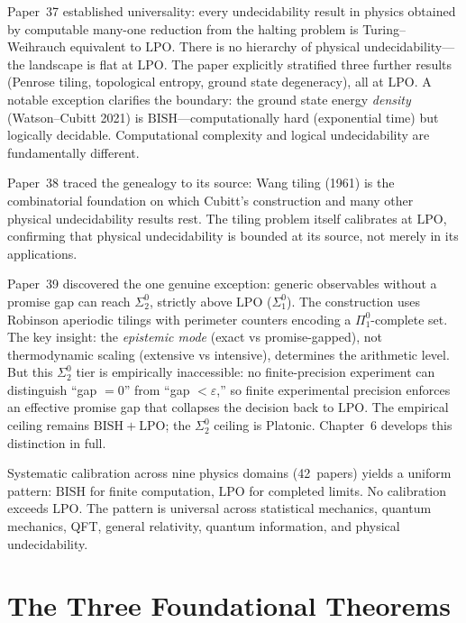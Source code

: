 \documentclass[11pt,a4paper]{report}
\theoremstyle{plain}
\theoremstyle{definition}
\theoremstyle{remark}
\newcommand{\BISH}{\mathrm{BISH}}
\newcommand{\LPO}{\mathrm{LPO}}
\begin{document}
Paper~37 established universality: every undecidability result in physics obtained by computable many-one reduction from the halting problem is Turing--Weihrauch equivalent to $\LPO$.  There is no hierarchy of physical undecidability---the landscape is flat at $\LPO$.  The paper explicitly stratified three further results (Penrose tiling, topological entropy, ground state degeneracy), all at $\LPO$.  A notable exception clarifies the boundary: the ground state energy \emph{density} (Watson--Cubitt 2021) is $\BISH$---computationally hard (exponential time) but logically decidable.  Computational complexity and logical undecidability are fundamentally different.

Paper~38 traced the genealogy to its source: Wang tiling (1961) is the combinatorial foundation on which Cubitt's construction and many other physical undecidability results rest.  The tiling problem itself calibrates at $\LPO$, confirming that physical undecidability is bounded at its source, not merely in its applications.

Paper~39 discovered the one genuine exception: generic observables without a promise gap can reach $\Sigma^0_2$, strictly above $\LPO$ ($\Sigma^0_1$).  The construction uses Robinson aperiodic tilings with perimeter counters encoding a $\Pi^0_1$-complete set.  The key insight: the \emph{epistemic mode} (exact vs promise-gapped), not thermodynamic scaling (extensive vs intensive), determines the arithmetic level.  But this $\Sigma^0_2$ tier is empirically inaccessible: no finite-precision experiment can distinguish ``gap $= 0$'' from ``gap $< \varepsilon$,'' so finite experimental precision enforces an effective promise gap that collapses the decision back to $\LPO$.  The empirical ceiling remains $\BISH+\LPO$; the $\Sigma^0_2$ ceiling is Platonic.  Chapter~6 develops this distinction in full.

\begin{chapterbox}
Systematic calibration across nine physics domains (42~papers) yields a uniform pattern: $\BISH$ for finite computation, $\LPO$ for completed limits. No calibration exceeds $\LPO$. The pattern is universal across statistical mechanics, quantum mechanics, QFT, general relativity, quantum information, and physical undecidability.
\end{chapterbox}

\chapter{The Three Foundational Theorems}
\end{document}
